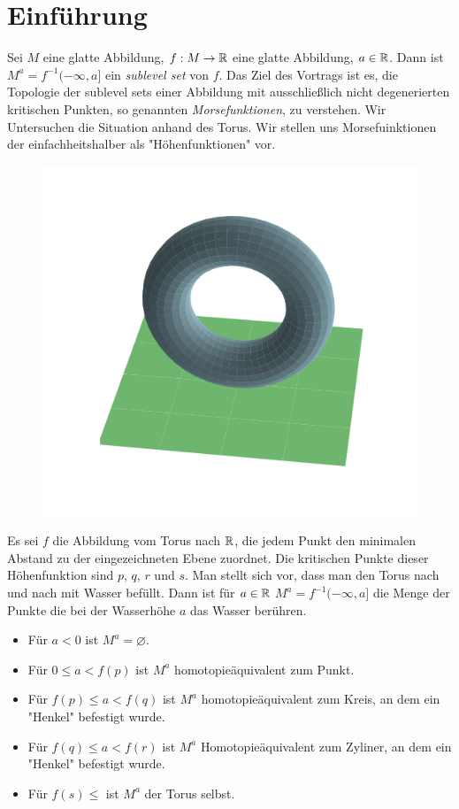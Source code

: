 \section{Einführung}

Sei $M$ eine glatte Abbildung, $f: M \to { \mathbb R }$ eine glatte Abbildung, 
$a \in { \mathbb R }$. Dann ist $M^a = f^{-1}(- \infty, a]$ ein \textit{sublevel set} von 
$f$. Das Ziel des Vortrags ist es, die Topologie der sublevel sets einer 
Abbildung mit ausschließlich nicht degenerierten kritischen Punkten, so genannten
\textit{Morsefunktionen}, zu verstehen.
Wir Untersuchen die Situation anhand des Torus. Wir stellen uns Morsefuinktionen
der einfachheitshalber als "Höhenfunktionen" vor.

\begin{figure}[H]
    \centering
    \includegraphics[width=0.8\linewidth]{resources/Me-Diagram1-torus-plane.png}
    \label{fig:me-diagram1}
\end{figure}

Es sei $f$ die Abbildung vom Torus nach ${ \mathbb R }$, die jedem Punkt den minimalen
Abstand zu der eingezeichneten Ebene zuordnet. 
Die kritischen Punkte dieser Höhenfunktion sind $p$, $q$, $r$ und $s$.
Man stellt sich vor, dass man den Torus nach und nach mit Wasser befüllt. Dann 
ist für $a \in { \mathbb R }$ $M^a = f^{-1}(-\infty, a]$ die Menge der Punkte die bei der
Wasserhöhe $a$ das Wasser berühren. 

\begin{itemize}
    \item Für $a < 0$ ist $M^a = \varnothing$.
    \item Für $0 \leq a < f(p)$ ist $M^a$ homotopieäquivalent zum Punkt.
    \item Für $f(p) \leq a < f(q)$ ist $M^a$ homotopieäquivalent zum Kreis,
        an dem ein "Henkel" befestigt wurde.
    \item Für $f(q) \leq a < f(r)$ ist $M^a$ Homotopieäquivalent zum Zyliner,
        an dem ein "Henkel" befestigt wurde.
    \item Für $f(s) \leq$ ist $M^a$ der Torus selbst.
\end{itemize}

